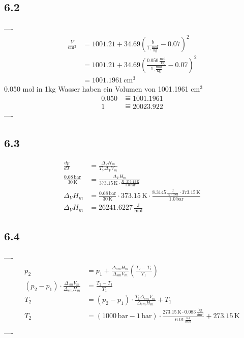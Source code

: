 \documentclass{article}
\begin{document}
\subsection*{6.2}
----
\begin{align*}
    \frac{V}{\mathrm{cm^3}}&=1001.21+34.69\left(\frac{b}{1,\mathrm{\frac{mol}{kg}}}-0.07\right)^2\\
    &=1001.21+34.69\left(\frac{0.050\,\mathrm{\frac{mol}{kg}}}{1,\mathrm{\frac{mol}{kg}}}-0.07\right)^2\\
    &= 1001.1961\,\mathrm{cm^3}
\end{align*}
0.050 mol  in 1kg Wasser haben ein Volumen von 1001.1961 cm$^3$\\
\begin{align*}
    0.050 &\hat{=} 1001.1961\\
    1 &\hat{=} 20023.922
\end{align*}
----

\subsection*{6.3}
\begin{align*}
    \frac{dp}{dT} &= \frac{\Delta_V H_m}{T_V \Delta_V V_m}\\
    \frac{0.68\,\mathrm{bar}}{30\,\mathrm{K}} &= \frac{\Delta_V H_m}{373.15\,\mathrm{K} \cdot \frac{R\cdot 373.15\,\mathrm{K}}{1.0\,\mathrm{bar}}}\\
    \Delta_V H_m &= \frac{0.68\,\mathrm{bar}}{30\,\mathrm{K}} \cdot 373.15\,\mathrm{K} \cdot \frac{8.3145\,\mathrm{\frac{J}{K\cdot mol}}\cdot 373.15\,\mathrm{K}}{1.0\,\mathrm{bar}}\\
    \Delta_V H_m &= 26241.6227\,\mathrm{\frac{J}{mol}}
\end{align*}


\subsection*{6.4}
----
\begin{align*}
    p_2 &= p_1 + \frac{\Delta_{sm}H_m}{\Delta_{sm}V_m}\left(\frac{T_2-T_1}{T_1}\right)\\
    \left(p_2 - p_1\right)\cdot \frac{\Delta_{sm}V_m}{\Delta_{sm}H_m} &= \frac{T_2-T_1}{T_1}\\
    T_2 &= \left(p_2 - p_1\right)\cdot \frac{T_1\Delta_{sm}V_m}{\Delta_{sm}H_m} + T_1\\
    T_2 &= \left(1000\,\mathrm{bar} - 1\,\mathrm{bar}\right)\cdot \frac{273.15\,\mathrm{K} \cdot 0.083\,\mathrm{\frac{kg}{dm^3}}}{6.01\,\mathrm{\frac{kJ}{mol}}} + 273.15\,\mathrm{K}\\
\end{align*}
----
\end{document}
